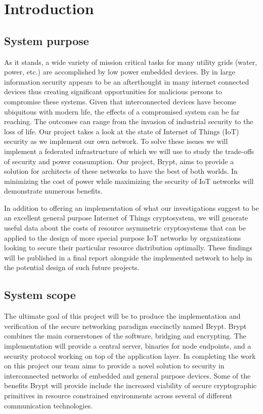 \documentclass[tikz,a4paper,titlepage]{article}
\begin{document}
\newpage

\section{Introduction}

\subsection{System purpose}
As it stands, a wide variety of mission critical tasks for many utility grids (water, power, etc.) are accomplished by low power embedded devices. By in large information security appears to be an afterthought in many internet connected devices thus creating significant opportunities for malicious persons to compromise these systems. Given that interconnected devices have become ubiquitous with modern life, the effects of a compromised system can be far reaching. The outcomes can range from the invasion of industrial security to the loss of life. Our project takes a look at the state of Internet of Things (IoT) security as we implement our own network. To solve these issues we will implement a federated infrastructure of which we will use to study the trade-offs of security and power consumption. Our project, Brypt, aims to provide a solution for architects of these networks to have the best of both worlds. In minimizing the cost of power while maximizing the security of IoT networks will demonstrate numerous benefits.

In addition to offering an implementation of what our investigations suggest to be an excellent general purpose Internet of Things cryptosystem, we will generate useful data about the costs of resource asymmetric cryptosystems that can be applied to the design of more special purpose IoT networks by organizations looking to secure their particular resource distribution optimally. These findings will be published in a final report alongside the implemented network to help in the potential design of such future projects.

\subsection{System scope}
The ultimate goal of this project will be to produce the implementation and verification of the secure networking paradigm succinctly named Brypt. Brypt combines the main cornerstones of the software, bridging and encrypting. The implementation will provide a central server, binaries for node endpoints, and a security protocol working on top of the application layer. In completing the work on this project our team aims to provide a novel solution to security in interconnected networks of embedded and general purpose devices. Some of the benefits Brypt will provide include the increased viability of secure cryptographic primitives in resource constrained environments across several of different communication technologies.
\end{document}
